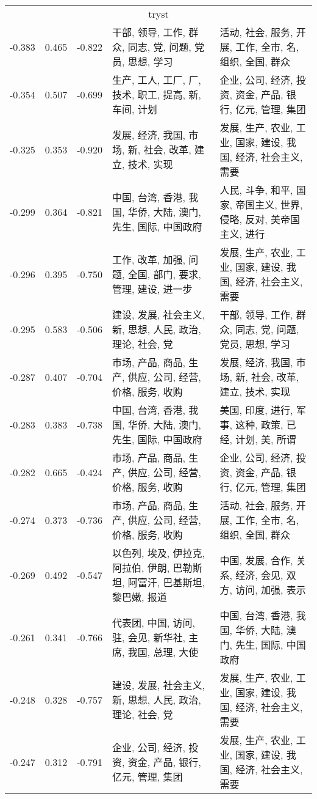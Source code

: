\begin{tabular}{cccp{5cm}p{5cm}}
\midrule
\multicolumn{5}{c}{tryst}\\
-0.383 & 0.465 & -0.822 & 干部, 领导, 工作, 群众, 同志, 党, 问题, 党员, 思想, 学习 & 活动, 社会, 服务, 开展, 工作, 全市, 名, 组织, 全国, 群众 \\
-0.354 & 0.507 & -0.699 & 生产, 工人, 工厂, 厂, 技术, 职工, 提高, 新, 车间, 计划 & 企业, 公司, 经济, 投资, 资金, 产品, 银行, 亿元, 管理, 集团 \\
-0.325 & 0.353 & -0.920 & 发展, 经济, 我国, 市场, 新, 社会, 改革, 建立, 技术, 实现 & 发展, 生产, 农业, 工业, 国家, 建设, 我国, 经济, 社会主义, 需要 \\
-0.299 & 0.364 & -0.821 & 中国, 台湾, 香港, 我国, 华侨, 大陆, 澳门, 先生, 国际, 中国政府 & 人民, 斗争, 和平, 国家, 帝国主义, 世界, 侵略, 反对, 美帝国主义, 进行 \\
-0.296 & 0.395 & -0.750 & 工作, 改革, 加强, 问题, 全国, 部门, 要求, 管理, 建设, 进一步 & 发展, 生产, 农业, 工业, 国家, 建设, 我国, 经济, 社会主义, 需要 \\
-0.295 & 0.583 & -0.506 & 建设, 发展, 社会主义, 新, 思想, 人民, 政治, 理论, 社会, 党 & 干部, 领导, 工作, 群众, 同志, 党, 问题, 党员, 思想, 学习 \\
-0.287 & 0.407 & -0.704 & 市场, 产品, 商品, 生产, 供应, 公司, 经营, 价格, 服务, 收购 & 发展, 经济, 我国, 市场, 新, 社会, 改革, 建立, 技术, 实现 \\
-0.283 & 0.383 & -0.738 & 中国, 台湾, 香港, 我国, 华侨, 大陆, 澳门, 先生, 国际, 中国政府 & 美国, 印度, 进行, 军事, 这种, 政策, 已经, 计划, 美, 所谓 \\
-0.282 & 0.665 & -0.424 & 市场, 产品, 商品, 生产, 供应, 公司, 经营, 价格, 服务, 收购 & 企业, 公司, 经济, 投资, 资金, 产品, 银行, 亿元, 管理, 集团 \\
-0.274 & 0.373 & -0.736 & 市场, 产品, 商品, 生产, 供应, 公司, 经营, 价格, 服务, 收购 & 活动, 社会, 服务, 开展, 工作, 全市, 名, 组织, 全国, 群众 \\
-0.269 & 0.492 & -0.547 & 以色列, 埃及, 伊拉克, 阿拉伯, 伊朗, 巴勒斯坦, 阿富汗, 巴基斯坦, 黎巴嫩, 报道 & 中国, 发展, 合作, 关系, 经济, 会见, 双方, 访问, 加强, 表示 \\
-0.261 & 0.341 & -0.766 & 代表团, 中国, 访问, 驻, 会见, 新华社, 主席, 我国, 总理, 大使 & 中国, 台湾, 香港, 我国, 华侨, 大陆, 澳门, 先生, 国际, 中国政府 \\
-0.248 & 0.328 & -0.757 & 建设, 发展, 社会主义, 新, 思想, 人民, 政治, 理论, 社会, 党 & 发展, 生产, 农业, 工业, 国家, 建设, 我国, 经济, 社会主义, 需要 \\
-0.247 & 0.312 & -0.791 & 企业, 公司, 经济, 投资, 资金, 产品, 银行, 亿元, 管理, 集团 & 发展, 生产, 农业, 工业, 国家, 建设, 我国, 经济, 社会主义, 需要 \\

\end{tabular}

